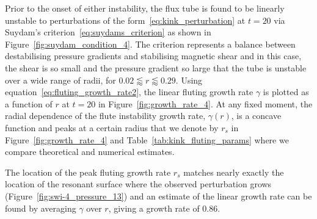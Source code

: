 \documentclass[fleqn,usenatbib]{mnras}
\newcommand{\rev}[1]{{\color{red} {#1}}}
\begin{document}
Prior to the onset of either instability, the flux tube is found to be linearly
unstable to perturbations of the form~\eqref{eq:kink_perturbation} at $t=20$
via Suydam's criterion~\eqref{eq:suydams_criterion} as shown in
Figure~\ref{fig:suydam_condition_4}. The criterion represents a
balance between destabilising pressure gradients and stabilising
magnetic shear and in this case, the shear is so small and the
pressure gradient so large that the tube is unstable over a wide range
of radii, for $ 0.02 \lessapprox r \lessapprox 0.29$.
\rev{Using equation~\eqref{eq:fluting_growth_rate2}, the} linear
fluting growth rate $\gamma$ is plotted as a function of $r$ at
$t=20$ in Figure~\ref{fig:growth_rate_4}. \rev{At any fixed moment,
the radial dependence of the flute instability growth rate, $\gamma(r)$, is a concave
function and peaks at a certain radius that we denote by $r_s$ in
Figure~\ref{fig:growth_rate_4} and Table~\ref{tab:kink_fluting_params}
where we compare theoretical and numerical estimates.}

The location of the peak \rev{fluting growth rate $r_s$} matches
nearly exactly the location of the resonant surface where the observed perturbation grows
(Figure~\ref{fig:swi-4_pressure_13}) and an estimate of the linear growth rate
can be found by averaging $\gamma$ over $r$, giving a growth rate of $0.86$.
\end{document}
